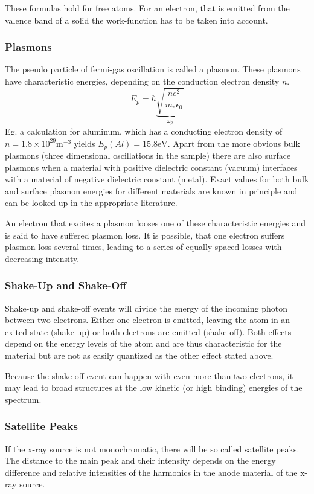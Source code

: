 \documentclass[a4paper]{scrartcl}
\numberwithin{equation}{section}
\numberwithin{figure}{section}
\numberwithin{table}{section}
\begin{document}
These formulas hold for free atoms. For an electron, that is emitted from the valence band of a solid the work-function has to be taken into account.


\subsubsection{Plasmons}
\label{sec:plasmonIntro}
The pseudo particle of fermi-gas oscillation is called a plasmon. These plasmons have characteristic energies, depending on the conduction electron density $n$. 
$$E_p = \hbar \underbrace{\sqrt{\frac{ne^2}{m_e \epsilon_0}}}_{\omega_p}$$
Eg. a calculation for aluminum, which has a conducting electron density of $n=1.8 \times 10^{29} \text{m}^{-3}$ yields $E_p(Al)=15.8 \text{eV}$.
Apart from the more obvious bulk plasmons (three dimensional oscillations in the sample) there are also surface plasmons when a material with positive dielectric constant (vacuum) interfaces with a material of negative dielectric constant (metal). Exact values for both bulk and surface plasmon energies for different materials are known in principle and can be looked up in the appropriate literature.

An electron that excites a plasmon looses one of these characteristic energies and is said to have suffered plasmon loss. It is possible, that one electron suffers plasmon loss several times, leading to a series of equally spaced losses with decreasing intensity.


\subsubsection{Shake-Up and Shake-Off}
Shake-up and shake-off events will divide the energy of the incoming photon between two electrons. Either one electron is emitted, leaving the atom in an exited state (shake-up) or both electrons are emitted (shake-off). Both effects depend on the energy levels of the atom and are thus characteristic for the material but are not as easily quantized as the other effect stated above.

Because the shake-off event can happen with even more than two electrons, it may lead to broad structures at the low kinetic (or high binding) energies of the spectrum.


\subsubsection{Satellite Peaks}
If the x-ray source is not monochromatic, there will be so called satellite peaks. The distance to the main peak and their intensity depends on the energy difference and relative intensities of the harmonics in the anode material of the x-ray source.
\end{document}
